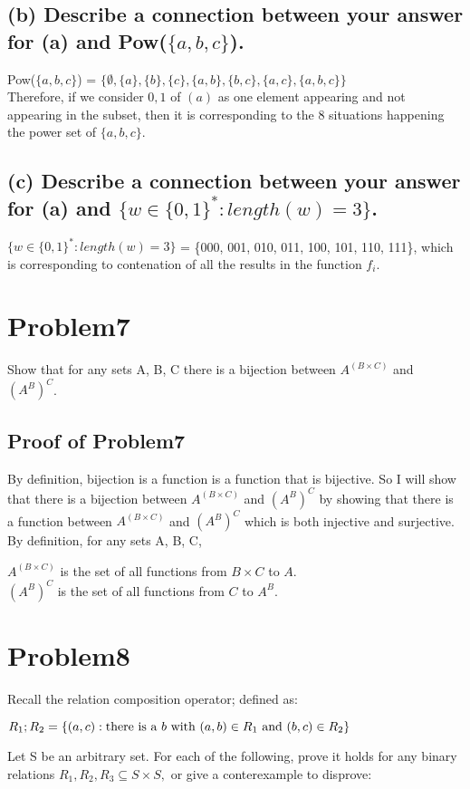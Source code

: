 \documentclass[]{article}
\begin{document}
\begin{spacing}{1.5}
\subsection*{(b) Describe a connection between your answer for (a) and Pow($ \{a, b, c\} $).}

Pow($ \{a, b, c\} $) = $ \{\emptyset, \{a\}, \{b\}, \{c\}, \{a, b\}, \{b, c\}, \{a, c\}, \{a, b, c\}  \} $\\
Therefore, if we consider $ 0, 1 $ of $ (a) $ as one element appearing and not appearing in the subset, then it is corresponding to the 8 situations happening the power set of $ \{a, b, c\} $.

\subsection*{(c) Describe a connection between your answer for (a) and $ \{w \in \{0,1\} ^ {*} : length(w) = 3\} $.}

$ \{w \in \{0,1\} ^ {*} : length(w) = 3\} $ = \{000, 001, 010, 011, 100, 101, 110, 111\}, which is corresponding to contenation of all the results in the function $ f_i $.

\section*{Problem7}
Show that for any sets A, B, C there is a bijection between $ A^{(B \times C)} $ and $ (A^{B})^{C} $. 
\subsection*{Proof of Problem7}
By definition, bijection is a function is a function that is bijective. So I will show that there is a bijection between $ A^{(B \times C)} $ and $ (A^{B})^{C} $ by showing that there is a function between $ A^{(B \times C)} $ and $ (A^{B})^{C} $ which is both injective and surjective.\\
By definition, for any sets A, B, C,
\begin{center}
	$ A^{(B \times C)} $ is the set of all functions from $ B \times C $ to $ A $.\\
	$ (A^{B})^{C} $ is the set of all functions from $ C $ to $ A^{B} $.
\end{center}

\section*{Problem8}
Recall the relation composition operator; defined as:
\begin{center}
	$ R_1; R_2 = \{(a, c) : \text{there is a $ b $ with } (a, b) \in R_1 \text{ and } (b, c) \in R_2\} $
\end{center}
Let S be an arbitrary set. For each of the following, prove it holds for any binary relations $ R_1, R_2, R_3  \subseteq S \times S,$ or give a conterexample to disprove:


\end{spacing}
\end{document}
